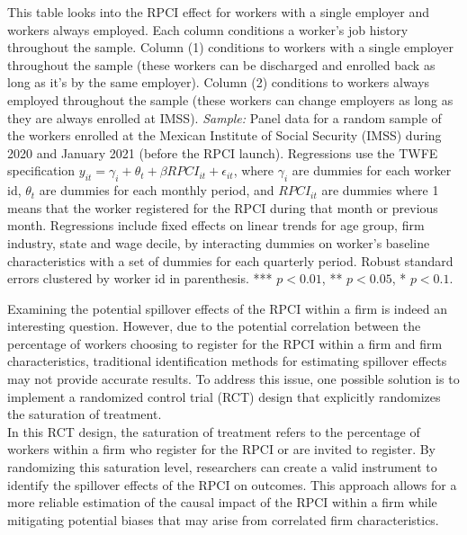 \documentclass[10pt, oneside]{book}
\begin{document}
\scriptsize{
\noindent This table looks into the RPCI effect for workers with a single employer and workers always employed. Each column conditions a worker's job history throughout the sample. Column (1) conditions to workers with a single employer throughout the sample (these workers can be discharged and enrolled back as long as it's by the same employer). Column (2) conditions to workers always employed throughout the sample (these workers can change employers as long as they are always enrolled at IMSS). \textit{Sample:} Panel data for a random sample of the workers enrolled at the Mexican Institute of Social Security (IMSS) during 2020 and January 2021 (before the RPCI launch). Regressions use the TWFE specification $y_{it} = \gamma_{i} + \theta_{t}+ \beta RPCI_{it} +\epsilon_{it}$, where $\gamma_{i}$ are dummies for each worker id, $\theta_{t}$ are dummies for each monthly period, and $RPCI_{it}$ are dummies where 1 means that the worker registered for the RPCI during that month or previous month. Regressions include fixed effects on linear trends for age group, firm industry, state and wage decile, by interacting dummies on worker's baseline characteristics with a set of dummies for each quarterly period. Robust standard errors clustered by worker id in parenthesis. *** $p<0.01$, ** $p<0.05$, * $p<0.1$.
} \\

\normalsize

Examining the potential spillover effects of the RPCI within a firm is indeed an interesting question. However, due to the potential correlation between the percentage of workers choosing to register for the RPCI within a firm and firm characteristics, traditional identification methods for estimating spillover effects may not provide accurate results. To address this issue, one possible solution is to implement a randomized control trial (RCT) design that explicitly randomizes the saturation of treatment. \\

In this RCT design, the saturation of treatment refers to the percentage of workers within a firm who register for the RPCI or are invited to register. By randomizing this saturation level, researchers can create a valid instrument to identify the spillover effects of the RPCI on outcomes. This approach allows for a more reliable estimation of the causal impact of the RPCI within a firm while mitigating potential biases that may arise from correlated firm characteristics. \\
\end{document}
